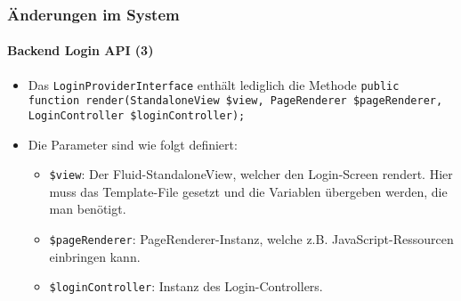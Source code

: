 \begin{frame}[fragile]
	\frametitle{Änderungen im System}
	\framesubtitle{Backend Login API (3)}

	\begin{itemize}

		\item Das \texttt{LoginProviderInterface} enthält lediglich die Methode\newline
			\smaller\texttt{public function render(StandaloneView \$view, PageRenderer \$pageRenderer, LoginController \$loginController);}\normalsize

		\item Die Parameter sind wie folgt definiert:

			\begin{itemize}
				\item \texttt{\$view}:\newline
					Der Fluid-StandaloneView, welcher den Login-Screen rendert.
					Hier muss das Template-File gesetzt und die Variablen
					übergeben werden, die man benötigt.
				\item \texttt{\$pageRenderer}:\newline
					PageRenderer-Instanz, welche z.B. JavaScript-Ressourcen
					einbringen kann.
				\item \texttt{\$loginController}:\newline
					Instanz des Login-Controllers.
			\end{itemize}

	\end{itemize}

\end{frame}


